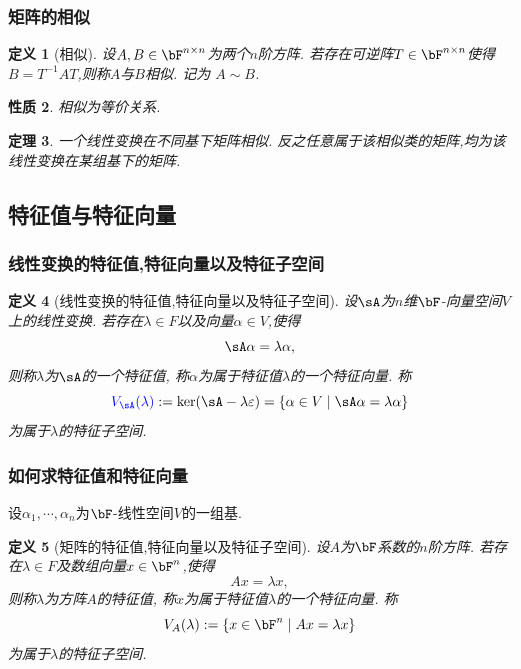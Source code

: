 \documentclass{article}
\newtheorem{theorem}{定理}  %
\newtheorem{proposition}[theorem]{性质}  %
\newtheorem{definition}[theorem]{定义}
\renewcommand{\blue }[1]{{\textcolor[rgb]{0,0,1}{#1}}}
\begin{document}
\subsubsection{矩阵的相似}
\begin{definition}[相似]
设$A,B\in \bF^{n\times n}$为两个$n$阶方阵.
若存在可逆阵$T\in \bF^{n\times n}$使得$B=T^{-1}AT$,则称$A$与$B$\blue{相似}.
记为 $A\sim B$.
\end{definition}
\begin{proposition}
相似为等价关系.
\end{proposition}
\begin{theorem}
一个线性变换在不同基下矩阵相似.
反之任意属于该相似类的矩阵,均为该线性变换在某组基下的矩阵.
\end{theorem}


\subsection{特征值与特征向量}

\subsubsection{线性变换的特征值,特征向量以及特征子空间}
\begin{definition}[线性变换的特征值,特征向量以及特征子空间]
设$\sA$为$n$维$\bF$-向量空间$V$上的线性变换.
若存在$\lambda\in F$以及向量$\alpha\in V$,使得
\[\sA\alpha = \lambda\alpha,\]
则称$\lambda$为$\sA$的一个\blue{特征值},
称$\alpha$为属于特征值$\lambda$的一个\blue{特征向量}.
称
\[\blue{V_\sA(\lambda)} :=\ker(\sA-\lambda \varepsilon)=\{\alpha\in V\mid \sA\alpha=\lambda\alpha\}\]
为属于$\lambda$的\blue{特征子空间}.
\end{definition}

\subsubsection{如何求特征值和特征向量}
设$\alpha_1,\cdots,\alpha_n$为$\bF$-线性空间$V$的一组基.
\begin{center}
\end{center}
\begin{definition}[矩阵的特征值,特征向量以及特征子空间]
设$A$为$\bF$系数的$n$阶方阵.
若存在$\lambda\in F$及数组向量$x\in \bF^n$,使得
\[Ax = \lambda x,\]
则称$\lambda$为方阵$A$的\blue{特征值},
称$x$为属于特征值$\lambda$的一个\blue{特征向量}.
称
\[V_A(\lambda):=\{x\in \bF^n\mid Ax=\lambda x\}\]
为属于$\lambda$的\blue{特征子空间}.
\end{definition}
\end{document}
